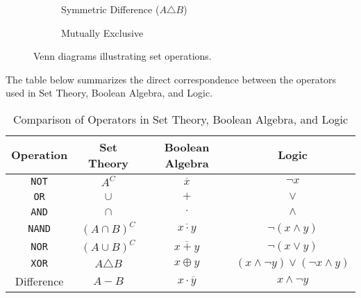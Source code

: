 \begin{figure}[htbp]
    \vspace{1em} %

    \begin{subfigure}[b]{0.45\textwidth}
        \centering
        \caption{Symmetric Difference ($A \triangle B$)}
    \end{subfigure}
    \hfill
    \begin{subfigure}[b]{0.45\textwidth}
        \centering
        \caption{Mutually Exclusive}
    \end{subfigure}

    \caption{Venn diagrams illustrating set operations.}
    \label{fig:combined_venn_3x2}
\end{figure}

\newpage

The table below summarizes the direct correspondence between the operators used in Set Theory, Boolean Algebra, and Logic.

\begin{table}[htbp]
    \centering
    \renewcommand{\arraystretch}{1.5}
    \begin{tabular}{|c|c|c|c|}
    \hline
    \textbf{Operation} & \textbf{Set Theory} & \textbf{Boolean Algebra} & \textbf{Logic} \\
    \hline
    \texttt{NOT} & $A^C$ & $\overline{x}$ & $\neg x$ \\
    \hline
    \texttt{OR} & $\cup$ & $+$ & $\vee$ \\
    \hline
    \texttt{AND} & $\cap$ & $\cdot$ & $\wedge$ \\
    \hline
    \texttt{NAND} & $(A \cap B)^C$ & $\overline{x \cdot y}$ & $\neg (x \wedge y)$\\
    \hline
    \texttt{NOR} & $(A \cup B)^C$ & $\overline{x + y}$ & $\neg (x \vee y)$ \\
    \hline
    \texttt{XOR} & $A \triangle B$ & $x \oplus y$ & $(x \wedge \neg y) \vee (\neg x \wedge y)$ \\
    \hline
    Difference & $A - B$ & $x \cdot \overline{y}$ & $x \wedge \neg y$ \\
    \hline
    \end{tabular}
    \caption{Comparison of Operators in Set Theory, Boolean Algebra, and Logic}
\end{table}

